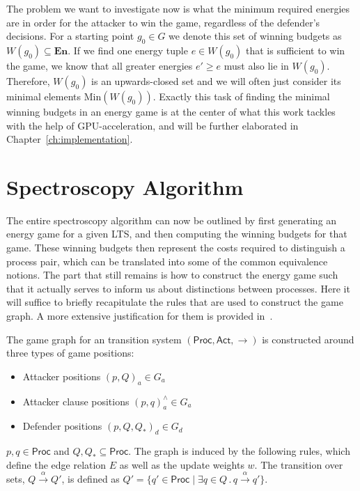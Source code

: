 The problem we want to investigate now is
what the minimum required energies are
in order for the attacker to win the game,
regardless of the defender's decisions.
For a starting point $g_0 \in G$ we denote this set of winning budgets as
$W(g_0) \subseteq \mathbf{En}$.
If we find one energy tuple $e \in W(g_0)$ that is sufficient to win the game,
we know that all greater energies $e' \geq e$ must also lie in $W(g_0)$.
Therefore, $W(g_0)$ is an upwards-closed set and we will often just consider
its minimal elements $\mathrm{Min}(W(g_0))$.
Exactly this task of finding the minimal winning budgets in an energy game
is at the center of what this work tackles with the help of GPU-acceleration,
and will be further elaborated in Chapter~\ref{ch:implementation}.


\section{Spectroscopy Algorithm}\label{sec:spectroscopy}

The entire spectroscopy algorithm can now be outlined by
first generating an energy game for a given LTS,
and then computing the winning budgets for that game.
These winning budgets then represent the costs required to distinguish a
process pair,
which can be translated into some of the common equivalence notions.
The part that still remains is how to construct the energy game
such that it actually serves to inform us about distinctions between processes.
Here it will suffice to briefly recapitulate the rules that are used to
construct the game graph.
A more extensive justification for them is provided in~\cite{bisping2023process}.

The game graph for an transition system
$(\mathsf{Proc}, \mathsf{Act}, {\rightarrow})$
is constructed around three types of game positions:

\begin{itemize}
    \item Attacker positions ${(p, Q)}_a \in G_a$
    \item Attacker clause positions ${(p, q)}_a^{\scriptscriptstyle\land} \in G_a$
    \item Defender positions ${(p, Q, Q_*)}_d \in G_d$
\end{itemize}

$p, q \in \mathsf{Proc}$ and $Q, Q_* \subseteq \mathsf{Proc}$.
The graph is induced by the following rules,
which define the edge relation $E$ as well as the update weights $w$.
The transition over sets, $Q \xrightarrow{\alpha} Q'$,
is defined as
$Q' = \{q' \in \mathsf{Proc} \mid
    \exists q \in Q\,.\,q \xrightarrow{\alpha} q'\}$.


